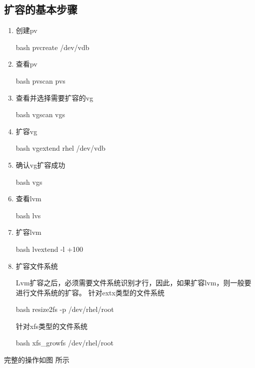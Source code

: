 \subsection{扩容的基本步骤}
\begin{enumerate}
  \item 创建pv
      \begin{code-block}{bash}
      pvcreate /dev/vdb
      \end{code-block}
  \item 查看pv
      \begin{code-block}{bash}
      pvscan
      pvs
      \end{code-block}
  \item 查看并选择需要扩容的vg
      \begin{code-block}{bash}
      vgscan
      vgs
      \end{code-block}
  \item 扩容vg
      \begin{code-block}{bash}
      vgextend rhel /dev/vdb
      \end{code-block}
  \item 确认vg扩容成功
      \begin{code-block}{bash}
      vgs
      \end{code-block}
  \item 查看lvm
      \begin{code-block}{bash}
      lvs
      \end{code-block}
  \item 扩容lvm
      \begin{code-block}{bash}
      lvextend -l +100%
      \end{code-block}
  \item 扩容文件系统

      Lvm扩容之后，必须需要文件系统识别才行，因此，如果扩容lvm，则一般要进行文件系统的扩容。
      针对extx类型的文件系统
      \begin{code-block}{bash}
      resize2fs -p /dev/rhel/root
      \end{code-block}
      针对xfs类型的文件系统
      \begin{code-block}{bash}
       xfs_growfs /dev/rhel/root
      \end{code-block}
\end{enumerate}
完整的操作如图 所示
